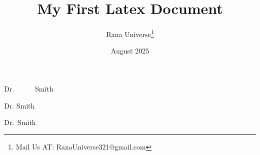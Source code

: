 \documentclass[12pt, letterpaper]{article}
\title{My First Latex Document}
\author{Rana Universe\thanks{Mail Us AT: RanaUniverse321@gmail.com}}
\date{August 2025}
\begin{document}
\maketitle


Dr.\ \ \ \ \ \ Smith

Dr. Smith

Dr.\ Smith




\end{document}
